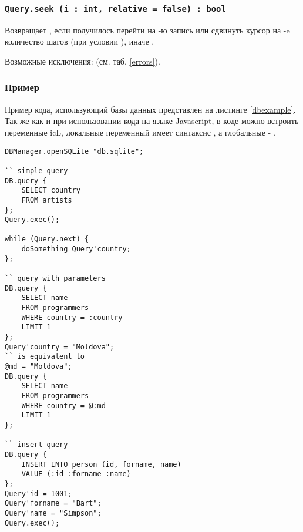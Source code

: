 \subsubsection{\lstinline|Query.seek (i : int, relative = false) : bool|}

Возвращает \true, если получилось перейти на -ю запись или сдвинуть курсор на -e количество шагов (при условии ), иначе \false.

Возможные исключения:  (см. таб. \ref{errors}).

\subsubsection{Пример}

Пример кода, использующий базы данных представлен на листинге \ref{dbexample}. Так же как и при использовании кода на языке Javascript, в коде можно встроить переменные icL, локальные переменный имеет синтаксис , а глобальные - .

\begin{lstlisting}[caption=Пример кода использующий базу данных, label=dbexample]
DBManager.openSQLite "db.sqlite";

`` simple query
DB.query {
	SELECT country
	FROM artists
};
Query.exec();

while (Query.next) {
    doSomething Query'country;
};

`` query with parameters
DB.query {
	SELECT name
	FROM programmers
	WHERE country = :country
	LIMIT 1
};
Query'country = "Moldova";
`` is equivalent to
@md = "Moldova";
DB.query {
	SELECT name
	FROM programmers
	WHERE country = @:md
	LIMIT 1
};

`` insert query
DB.query {
	INSERT INTO person (id, forname, name)
	VALUE (:id :forname :name)
};
Query'id = 1001;
Query'forname = "Bart";
Query'name = "Simpson";
Query.exec();
\end{lstlisting}

